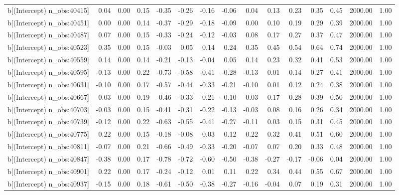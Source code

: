 \begin{table}[ht]
\begin{tabular}{rrrrrrrrrrrrrrr}
  b[(Intercept) n\_obs:40415] & 0.04 & 0.00 & 0.15 & -0.35 & -0.26 & -0.16 & -0.06 & 0.04 & 0.13 & 0.23 & 0.35 & 0.45 & 2000.00 & 1.00 \\ 
  b[(Intercept) n\_obs:40451] & 0.00 & 0.00 & 0.14 & -0.37 & -0.29 & -0.18 & -0.09 & 0.00 & 0.10 & 0.19 & 0.29 & 0.39 & 2000.00 & 1.00 \\ 
  b[(Intercept) n\_obs:40487] & 0.07 & 0.00 & 0.15 & -0.33 & -0.24 & -0.12 & -0.03 & 0.08 & 0.17 & 0.27 & 0.37 & 0.47 & 2000.00 & 1.00 \\ 
  b[(Intercept) n\_obs:40523] & 0.35 & 0.00 & 0.15 & -0.03 & 0.05 & 0.14 & 0.24 & 0.35 & 0.45 & 0.54 & 0.64 & 0.74 & 2000.00 & 1.00 \\ 
  b[(Intercept) n\_obs:40559] & 0.14 & 0.00 & 0.14 & -0.21 & -0.13 & -0.04 & 0.05 & 0.14 & 0.23 & 0.32 & 0.41 & 0.53 & 2000.00 & 1.00 \\ 
  b[(Intercept) n\_obs:40595] & -0.13 & 0.00 & 0.22 & -0.73 & -0.58 & -0.41 & -0.28 & -0.13 & 0.01 & 0.14 & 0.27 & 0.41 & 2000.00 & 1.00 \\ 
  b[(Intercept) n\_obs:40631] & -0.10 & 0.00 & 0.17 & -0.57 & -0.44 & -0.33 & -0.21 & -0.10 & 0.01 & 0.12 & 0.24 & 0.38 & 2000.00 & 1.00 \\ 
  b[(Intercept) n\_obs:40667] & 0.03 & 0.00 & 0.19 & -0.46 & -0.33 & -0.21 & -0.10 & 0.03 & 0.17 & 0.28 & 0.39 & 0.50 & 2000.00 & 1.00 \\ 
  b[(Intercept) n\_obs:40703] & -0.03 & 0.00 & 0.15 & -0.41 & -0.31 & -0.22 & -0.13 & -0.03 & 0.08 & 0.16 & 0.26 & 0.34 & 2000.00 & 1.00 \\ 
  b[(Intercept) n\_obs:40739] & -0.12 & 0.00 & 0.22 & -0.63 & -0.55 & -0.41 & -0.27 & -0.11 & 0.03 & 0.15 & 0.31 & 0.45 & 2000.00 & 1.00 \\ 
  b[(Intercept) n\_obs:40775] & 0.22 & 0.00 & 0.15 & -0.18 & -0.08 & 0.03 & 0.12 & 0.22 & 0.32 & 0.41 & 0.51 & 0.60 & 2000.00 & 1.00 \\ 
  b[(Intercept) n\_obs:40811] & -0.07 & 0.00 & 0.21 & -0.66 & -0.49 & -0.33 & -0.20 & -0.07 & 0.07 & 0.20 & 0.33 & 0.48 & 2000.00 & 1.00 \\ 
  b[(Intercept) n\_obs:40847] & -0.38 & 0.00 & 0.17 & -0.78 & -0.72 & -0.60 & -0.50 & -0.38 & -0.27 & -0.17 & -0.06 & 0.04 & 2000.00 & 1.00 \\ 
  b[(Intercept) n\_obs:40901] & 0.22 & 0.00 & 0.17 & -0.24 & -0.12 & 0.01 & 0.11 & 0.22 & 0.34 & 0.44 & 0.55 & 0.67 & 2000.00 & 1.00 \\ 
  b[(Intercept) n\_obs:40937] & -0.15 & 0.00 & 0.18 & -0.61 & -0.50 & -0.38 & -0.27 & -0.16 & -0.04 & 0.07 & 0.19 & 0.31 & 2000.00 & 1.00 \\ 

\end{tabular}
\end{table}
